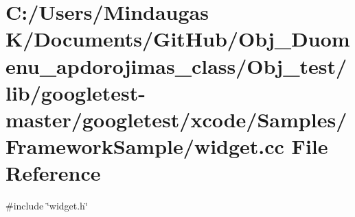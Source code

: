 \hypertarget{_obj__test_2lib_2googletest-master_2googletest_2xcode_2_samples_2_framework_sample_2widget_8cc}{}\section{C\+:/\+Users/\+Mindaugas K/\+Documents/\+Git\+Hub/\+Obj\+\_\+\+Duomenu\+\_\+apdorojimas\+\_\+class/\+Obj\+\_\+test/lib/googletest-\/master/googletest/xcode/\+Samples/\+Framework\+Sample/widget.cc File Reference}
\label{_obj__test_2lib_2googletest-master_2googletest_2xcode_2_samples_2_framework_sample_2widget_8cc}
{\ttfamily \#include \char`\"{}widget.\+h\char`\"{}}\newline
